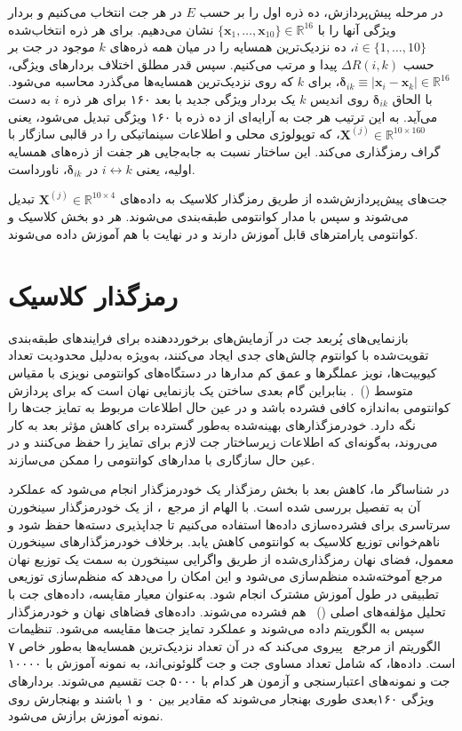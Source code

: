 در مرحله پیش‌پردازش، ده ذره اول را بر حسب $E$ در هر جت انتخاب می‌کنیم و بردار ویژگی آنها را با $\{\mathbf{x}_1,\dots,\mathbf{x}_{10}\}\in\mathbb{R}^{16}$ نشان می‌دهیم. برای هر ذره انتخاب‌شده $i\in\{1,\dots,10\}$، ده نزدیک‌ترین همسایه را در میان همه ذره‌های $k$ موجود در جت بر حسب $\Delta R(i,k)$ پیدا و مرتب می‌کنیم. سپس قدر مطلق اختلاف بردارهای ویژگی، $\boldsymbol{\delta}_{ik}\equiv|\mathbf{x}_i-\mathbf{x}_k|\in\mathbb{R}^{16}$، برای $k$ که روی نزدیک‌ترین همسایه‌ها می‌گذرد محاسبه می‌شود. با الحاق $\boldsymbol{\delta}_{ik}$ روی اندیس $k$ یک بردار ویژگی جدید با بعد ۱۶۰ برای هر ذره $i$ به دست می‌آید. به این ترتیب هر جت به آرایه‌ای از ده ذره با ۱۶۰ ویژگی تبدیل می‌شود، یعنی $\mathbf{X}^{(j)}\in\mathbb{R}^{10\times160}$، که توپولوژی محلی و اطلاعات سینماتیکی را در قالبی سازگار با گراف رمزگذاری می‌کند. این ساختار نسبت به جابه‌جایی هر جفت از ذره‌های همسایه اولیه، یعنی $i\leftrightarrow k$ در $\boldsymbol{\delta}_{ik}$، ناورداست.

جت‌های پیش‌پردازش‌شده از طریق رمزگذار کلاسیک به داده‌های $\mathbf{X}^{(j)}\in\mathbb{R}^{10\times4}$ تبدیل می‌شوند و سپس با مدار کوانتومی طبقه‌بندی می‌شوند. هر دو بخش کلاسیک و کوانتومی پارامترهای قابل آموزش دارند و در نهایت با هم آموزش داده می‌شوند.

\section{رمزگذار کلاسیک}
\label{sec:ch1-encoder}
بازنمایی‌های پُربعد جت در آزمایش‌های برخورددهنده برای فرایندهای طبقه‌بندی تقویت‌شده با کوانتوم چالش‌های جدی ایجاد می‌کنند، به‌ویژه به‌دلیل محدودیت تعداد کیوبیت‌ها، نویز عملگر‌ها و عمق کم مدارها در دستگاه‌های کوانتومی نویزی با مقیاس متوسط ()~\cite{Odagiu:2025,Belis:2024}. بنابراین گام بعدی ساختن یک بازنمایی نهان است که برای پردازش کوانتومی به‌اندازه کافی فشرده باشد و در عین حال اطلاعات مربوط به تمایز جت‌ها را نگه دارد. خودرمزگذارهای بهینه‌شده به‌طور گسترده برای کاهش مؤثر بعد به کار می‌روند، به‌گونه‌ای که اطلاعات زیرساختار جت لازم برای تمایز را حفظ می‌کنند و در عین حال سازگاری با مدارهای کوانتومی را ممکن می‌سازند.

در شناساگر ما، کاهش بعد با بخش رمزگذار یک خودرمزگذار انجام می‌شود که عملکرد آن به تفصیل بررسی شده است. با الهام از مرجع~\cite{Kamil:2020}، از یک خودرمزگذار سینخورن سرتاسری برای فشرده‌سازی داده‌ها استفاده می‌کنیم تا جداپذیری دسته‌ها حفظ شود و ناهم‌خوانی توزیع کلاسیک به کوانتومی کاهش یابد. برخلاف خودرمزگذارهای سینخورن معمول، فضای نهان رمزگذاری‌شده از طریق واگرایی سینخورن به سمت یک توزیع نهان مرجع آموخته‌شده منظم‌سازی می‌شود و این امکان را می‌دهد که منظم‌سازی توزیعی تطبیقی در طول آموزش مشترک انجام شود. به‌عنوان معیار مقایسه، داده‌های جت با تحلیل مؤلفه‌های اصلی ()~\cite{Pearson:1901} هم فشرده می‌شوند. داده‌های فضاهای نهان  و خودرمزگذار سپس به الگوریتم  داده می‌شوند و عملکرد تمایز جت‌ها مقایسه می‌شود. تنظیمات الگوریتم  از مرجع~\cite{Qu:2019gqs} پیروی می‌کند که در آن تعداد نزدیک‌ترین همسایه‌ها به‌طور خاص ۷ است. داده‌ها، که شامل تعداد مساوی جت \Zbos{} و جت گلوئونی‌اند، به نمونه آموزش با ۱۰۰۰۰ جت و نمونه‌های اعتبارسنجی و آزمون هر کدام با ۵۰۰۰ جت تقسیم می‌شوند. بردارهای ویژگی ۱۶۰‌بعدی طوری بهنجار می‌شوند که مقادیر بین ۰ و ۱ باشند و بهنجارش روی نمونه آموزش برازش می‌شود.

